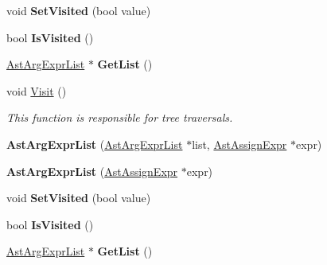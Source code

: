 \begin{DoxyCompactItemize}
\item 
\hypertarget{classAstArgExprList_a373feb9ea4fdef7d6eede9be2a673ac9}{void {\bfseries Set\-Visited} (bool value)}\label{classAstArgExprList_a373feb9ea4fdef7d6eede9be2a673ac9}

\item 
\hypertarget{classAstArgExprList_a6be96ce331bf80a8ffd2314eab2fd8bf}{bool {\bfseries Is\-Visited} ()}\label{classAstArgExprList_a6be96ce331bf80a8ffd2314eab2fd8bf}

\item 
\hypertarget{classAstArgExprList_a07413ac154eea5ed2c43d83865b128e2}{\hyperlink{classAstArgExprList}{Ast\-Arg\-Expr\-List} $\ast$ {\bfseries Get\-List} ()}\label{classAstArgExprList_a07413ac154eea5ed2c43d83865b128e2}

\item 
void \hyperlink{classAstArgExprList_aeac192a90197b0de59114cea84a1e577}{Visit} ()
\begin{DoxyCompactList}\small\item\em This function is responsible for tree traversals. \end{DoxyCompactList}\item 
\hypertarget{classAstArgExprList_a6aafae6eaadd5db52a33768136657610}{{\bfseries Ast\-Arg\-Expr\-List} (\hyperlink{classAstArgExprList}{Ast\-Arg\-Expr\-List} $\ast$list, \hyperlink{classAstAssignExpr}{Ast\-Assign\-Expr} $\ast$expr)}\label{classAstArgExprList_a6aafae6eaadd5db52a33768136657610}

\item 
\hypertarget{classAstArgExprList_a4acc4d03bbbe66b9a19e991d21169414}{{\bfseries Ast\-Arg\-Expr\-List} (\hyperlink{classAstAssignExpr}{Ast\-Assign\-Expr} $\ast$expr)}\label{classAstArgExprList_a4acc4d03bbbe66b9a19e991d21169414}

\item 
\hypertarget{classAstArgExprList_a373feb9ea4fdef7d6eede9be2a673ac9}{void {\bfseries Set\-Visited} (bool value)}\label{classAstArgExprList_a373feb9ea4fdef7d6eede9be2a673ac9}

\item 
\hypertarget{classAstArgExprList_a6be96ce331bf80a8ffd2314eab2fd8bf}{bool {\bfseries Is\-Visited} ()}\label{classAstArgExprList_a6be96ce331bf80a8ffd2314eab2fd8bf}

\item 
\hypertarget{classAstArgExprList_a07413ac154eea5ed2c43d83865b128e2}{\hyperlink{classAstArgExprList}{Ast\-Arg\-Expr\-List} $\ast$ {\bfseries Get\-List} ()}\label{classAstArgExprList_a07413ac154eea5ed2c43d83865b128e2}


\end{DoxyCompactItemize}

